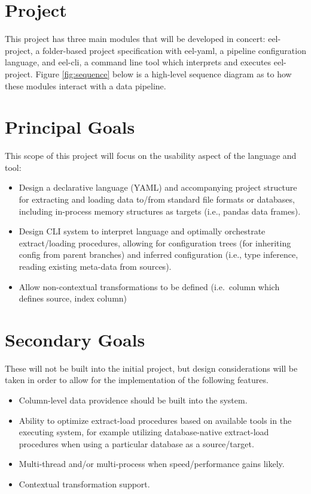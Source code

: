 \chapter{Project}\label{project}

This project has three main modules that will be developed in concert:
eel-project, a folder-based project specification with eel-yaml, a
pipeline configuration language, and eel-cli, a command line tool which
interprets and executes eel-project. Figure \ref{fig:sequence} below is
a high-level sequence diagram as to how these modules interact with a
data pipeline.



\chapter{Principal Goals}\label{principal-goals}

This scope of this project will focus on the usability aspect of the
language and tool:

\begin{itemize}
\item
  Design a declarative language (YAML) and accompanying project
  structure for extracting and loading data to/from standard file
  formats or databases, including in-process memory structures as
  targets (i.e., pandas data frames).
\item
  Design CLI system to interpret language and optimally orchestrate
  extract/loading procedures, allowing for configuration trees (for
  inheriting config from parent branches) and inferred configuration
  (i.e., type inference, reading existing meta-data from sources).
\item
  Allow non-contextual transformations to be defined (i.e.~column which
  defines source, index column)
\end{itemize}

\chapter{Secondary Goals}\label{secondary-goals}

These will not be built into the initial project, but design
considerations will be taken in order to allow for the implementation of
the following features.

\begin{itemize}
\item
  Column-level data providence should be built into the system.
\item
  Ability to optimize extract-load procedures based on available tools
  in the executing system, for example utilizing database-native
  extract-load procedures when using a particular database as a
  source/target.
\item
  Multi-thread and/or multi-process when speed/performance gains likely.
\item
  Contextual transformation support.
\end{itemize}

